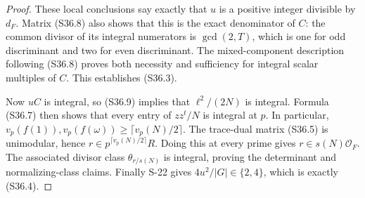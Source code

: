 \documentclass[11pt,a4paper]{article}
\theoremstyle{definition}
\begin{document}
\begin{proof}
These local conclusions say exactly that $u$ is a
positive integer divisible by $d_F$. Matrix (S36.8)
also shows that this is the exact denominator of $C$:
the common divisor of its integral numerators is
$\gcd(2,T)$, which is one for odd discriminant and two
for even discriminant. The mixed-component description
following (S36.8) proves both necessity and sufficiency
for integral scalar multiples of $C$. This establishes
(S36.3).

Now $uC$ is integral, so (S36.9) implies that
$\ell^2/(2N)$ is integral. Formula (S36.7) then shows
that every entry of $zz^t/N$ is integral at $p$.
In particular,
$v_p(f(1)),v_p(f(\omega))\ge\lceil v_p(N)/2\rceil$.
The trace-dual matrix (S36.5) is unimodular, hence
$r\in p^{\lceil v_p(N)/2\rceil}R$.
Doing this at every prime gives $r\in s(N)\mathcal O_F$.
The associated divisor class $\theta_{r/s(N)}$ is
integral, proving the determinant and normalizing-class
claims. Finally S-22 gives $4u^2/|G|\in\{2,4\}$,
which is exactly (S36.4).
\end{proof}
\end{document}
